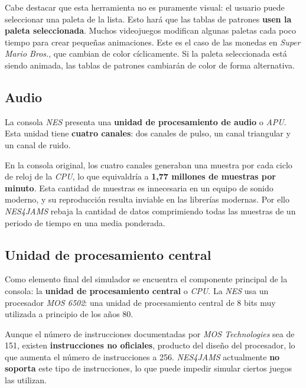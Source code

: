 Cabe destacar que esta herramienta no es puramente visual:
el usuario puede seleccionar una paleta de la lista.
Esto hará que las tablas de patrones \textbf{usen la paleta seleccionada}.
Muchos videojuegos modifican algunas paletas cada poco tiempo
para crear pequeñas animaciones.
Este es el caso de las monedas en \textit{Super Mario Bros.}, que
cambian de color cíclicamente.
Si la paleta seleccionada está siendo animada, las tablas de patrones
cambiarán de color de forma alternativa.

\subsection{Audio}\label{subsec:audio}

La consola \textit{NES} presenta
una \textbf{unidad de procesamiento de audio} o \textit{APU}\cite{APU}.
Esta unidad tiene \textbf{cuatro canales}: dos canales de pulso,
un canal triangular y un canal de ruido.

En la consola original, los cuatro canales generaban una muestra
por cada ciclo de reloj de la \textit{CPU}, lo que equivaldría
a \textbf{1,77 millones de muestras por minuto}.
Esta cantidad de muestras es innecesaria en un equipo de sonido
moderno, y su reproducción resulta inviable en las librerías
modernas.
Por ello \textit{NES4JAMS} rebaja la cantidad de datos comprimiendo
todas las muestras de un periodo de tiempo en una media ponderada.

\subsection{Unidad de procesamiento central}\label{subsec:unidad-de-procesamiento-central}

Como elemento final del simulador se encuentra el componente
principal de la consola: la \textbf{unidad de procesamiento central}
o \textit{CPU}.
La \textit{NES} usa un procesador \textit{MOS 6502}\cite{MOS6502}: una unidad
de procesamiento central de 8 bits muy utilizada a principio
de los años 80.

Aunque el número de instrucciones documentadas por \textit{MOS Technologies}
sea de 151, existen \textbf{instrucciones no oficiales}, producto del diseño
del procesador, lo que aumenta el número de instrucciones a 256.
\textit{NES4JAMS} actualmente \textbf{no soporta} este tipo de instrucciones,
lo que puede impedir simular ciertos juegos las utilizan.

